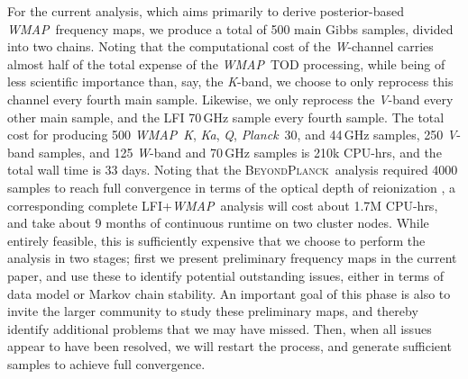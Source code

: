 \documentclass[twocolumn]{../../common/aa}
\def\WMAP{\emph{WMAP}}
\def\Planck{\emph{Planck}}
\newcommand{\bp}{\textsc{BeyondPlanck}}
\newcommand{\K}[0]{\textit K}
\newcommand{\Ka}[0]{\textit{Ka}}
\newcommand{\Q}[0]{\textit Q}
\newcommand{\V}[0]{\textit V}
\newcommand{\W}[0]{\textit W}
\begin{document}
For the current analysis, which aims primarily to derive posterior-based \WMAP\ frequency maps, we produce a total of 500 main Gibbs samples, divided into two chains. Noting that the computational cost of the \W-channel carries almost half of the total expense of the \WMAP\ TOD processing, while being of less scientific importance than, say, the \K-band, we choose to only reprocess this channel every fourth main sample. Likewise, we only reprocess the \V-band every other main sample, and the LFI 70\,GHz sample every fourth sample. The total cost for producing 500 \WMAP\ \K, \Ka, \Q, \Planck\ 30, and 44\,GHz samples, 250 \V-band samples, and 125 \W-band and 70\,GHz samples is 210k CPU-hrs, and the total wall time is 33 days. Noting that the \bp\ analysis required 4000 samples to reach full convergence in terms of the optical depth of reionization \citep{bp12}, a corresponding complete LFI+\WMAP\ analysis will cost about 1.7M CPU-hrs, and take about 9 months of continuous runtime on two cluster nodes. While entirely feasible, this is sufficiently expensive that we choose to perform the analysis in two stages; first we present preliminary frequency maps in the current paper, and use these to identify potential outstanding issues, either in terms of data model or Markov chain stability. An important goal of this phase is also to invite the larger community to study these preliminary maps, and thereby identify additional problems that we may have missed. Then, when all issues appear to have been resolved, we will restart the process, and generate sufficient samples to achieve full convergence.











\end{document}
